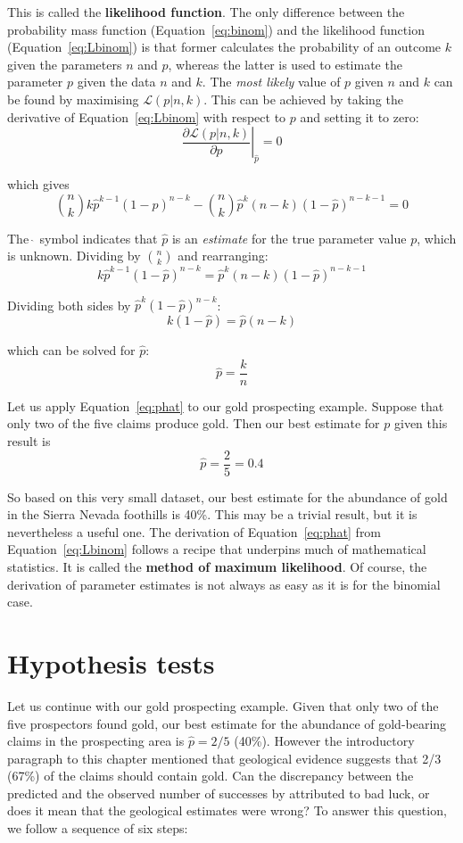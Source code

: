 This is called the \textbf{likelihood function}. The only difference
between the probability mass function (Equation~\ref{eq:binom}) and
the likelihood function (Equation~\ref{eq:Lbinom}) is that former
calculates the probability of an outcome $k$ given the parameters $n$
and $p$, whereas the latter is used to estimate the parameter $p$
given the data $n$ and $k$. The \emph{most likely} value of $p$ given
$n$ and $k$ can be found by maximising $\mathcal{L}(p|n,k)$.  This can
be achieved by taking the derivative of Equation~\ref{eq:Lbinom} with
respect to $p$ and setting it to zero:
\[
\left.\frac{\partial{\mathcal{L}(p|n,k)}}{\partial{p}}\right|_{\hat{p}} = 0
\]

\noindent which gives
\[
\binom{n}{k} k \hat{p}^{k-1} (1-\hat{p})^{n-k} -
\binom{n}{k} \hat{p}^k (n-k) (1-\hat{p})^{n-k-1} = 0
\]

The $\hat{~}$ symbol indicates that $\hat{p}$ is an \emph{estimate}
for the true parameter value $p$, which is unknown. Dividing by
$\binom{n}{k}$ and rearranging:
\[
  k \hat{p}^{k-1} (1-\hat{p})^{n-k} = \hat{p}^k (n-k) (1-\hat{p})^{n-k-1}
\]

Dividing both sides by $\hat{p}^k (1-\hat{p})^{n-k}$:
\[
k (1-\hat{p}) = \hat{p} (n-k)
\]

\noindent which can be solved for $\hat{p}$:
\begin{equation}
  \hat{p} = \frac{k}{n}
  \label{eq:phat}
\end{equation}

Let us apply Equation~\ref{eq:phat} to our gold prospecting example.
Suppose that only two of the five claims produce gold. Then our best
estimate for $p$ given this result is
\[
\hat{p} = \frac{2}{5} = 0.4
\]

So based on this very small dataset, our best estimate for the
abundance of gold in the Sierra Nevada foothills is 40\%. This may be
a trivial result, but it is nevertheless a useful one. The derivation
of Equation~\ref{eq:phat} from Equation~\ref{eq:Lbinom} follows a
recipe that underpins much of mathematical statistics. It is called
the \textbf{method of maximum likelihood}. Of course, the derivation
of parameter estimates is not always as easy as it is for the binomial
case.

\section{Hypothesis tests}
\label{sec:binomH}

Let us continue with our gold prospecting example. Given that only two
of the five prospectors found gold, our best estimate for the
abundance of gold-bearing claims in the prospecting area is $\hat{p} =
2/5$ (40\%). However the introductory paragraph to this chapter
mentioned that geological evidence suggests that 2/3 (67\%) of the
claims should contain gold. Can the discrepancy between the predicted
and the observed number of successes by attributed to bad luck, or
does it mean that the geological estimates were wrong? To answer this
question, we follow a sequence of six steps:

